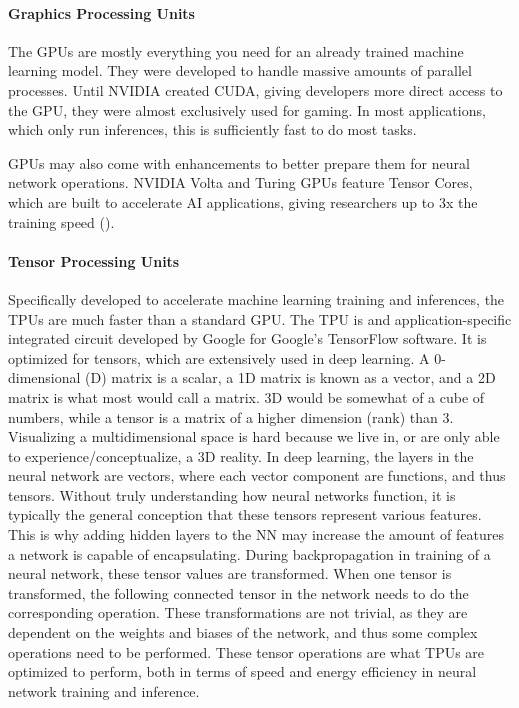 \paragraph{Graphics Processing Units}
The GPUs are mostly everything you need for an already trained machine learning model. They were developed to handle massive amounts of parallel processes. Until NVIDIA created CUDA, giving developers more direct access to the GPU, they were almost exclusively used for gaming. In most applications, which only run inferences, this is sufficiently fast to do most tasks. 

GPUs may also come with enhancements to better prepare them for neural network operations. NVIDIA Volta and Turing GPUs feature Tensor Cores, which are built to accelerate AI applications, giving researchers up to 3x the training speed (\cite{gu2019single_double_precision_computing}).

\paragraph{Tensor Processing Units}
Specifically developed to accelerate machine learning training and inferences, the TPUs are much faster than a standard GPU. The TPU is and application-specific integrated circuit developed by Google for Google's TensorFlow software. It is optimized for tensors, which are extensively used in deep learning. A 0-dimensional (D) matrix is a scalar, a 1D matrix is known as a vector, and a 2D matrix is what most would call a matrix. 3D would be somewhat of a cube of numbers, while a tensor is a matrix of a higher dimension (rank) than 3. Visualizing a multidimensional space is hard because we live in, or are only able to experience/conceptualize, a 3D reality. In deep learning, the layers in the neural network are vectors, where each vector component are functions, and thus tensors. Without truly understanding how neural networks function, it is typically the general conception that these tensors represent various features. This is why adding hidden layers to the NN may increase the amount of features a network is capable of encapsulating. During backpropagation in training of a neural network, these tensor values are transformed. When one tensor is transformed, the following connected tensor in the network needs to do the corresponding operation. These transformations are not trivial, as they are dependent on the weights and biases of the network, and thus some complex operations need to be performed. These tensor operations are what TPUs are optimized to perform, both in terms of speed and energy efficiency in neural network training and inference. 

